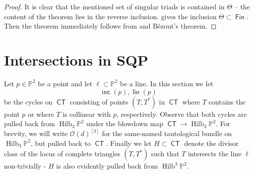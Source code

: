 \documentclass{article}
\renewcommand{\P}{\mathbb{P}}
\DeclareMathOperator{\Hilb}{Hilb}
\renewcommand{\O}{\mathcal{O}}
\DeclareMathOperator{\CT}{\mathsf{CT}}
\DeclareMathOperator{\Fin}{\mathsf{Fin}}
\DeclareMathOperator{\lin}{\mathsf{lin}}
\DeclareMathOperator{\inc}{\mathsf{inc}}
\begin{document}

\begin{proof}
    It is clear that the mentioned set of singular triads is contained in $\Theta$ -- the content of the theorem lies in the  reverse inclusion.   gives the inclusion $\Theta \subset \Fin$. Then the theorem immediately follows from  and B\'ezout's theorem.
\end{proof}



\section{Intersections in SQP}
\label{sec:finishing}

Let $p \in \P^{2}$ be a point and let $\ell \subset \P^{2}$ be a line. In this section we let $$\inc(p), \lin(p)$$ be the cycles on $\CT$ consisting of points $(T,T^{*})$ in $\CT$ where $T$ contains the point $p$ or where $T$ is collinear with $p$, respectively.  Observe that both cycles are pulled back from $\Hilb_{3}\P^{2}$ under the blowdown map $\CT \to \Hilb_{3}\P^{2}$. For brevity, we will write $\O(d)^{[3]}$ for the same-named tautological bundle on $\Hilb_{3}\P^{2}$, but pulled back to $\CT$.  Finally we let $H \subset \CT$ denote the divisor class of the locus of complete triangles $(T,T^{*})$ such that $T$ intersects the line $\ell$ non-trivially - $H$ is also evidently pulled back from $\Hilb^{3}\P^{2}$.  


 
\end{document}
